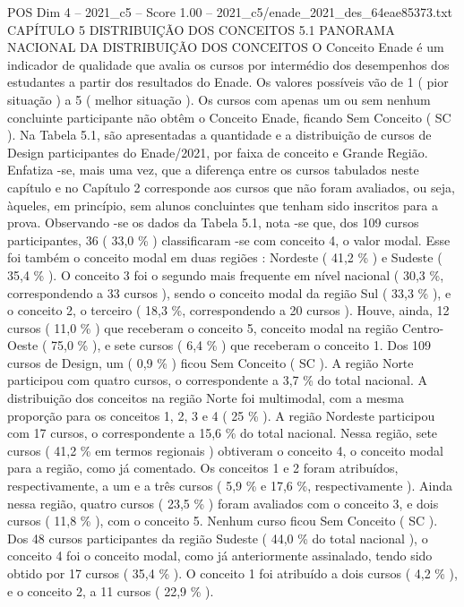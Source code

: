 \begin{textsample}{POS Dim 4 – 2021\_c5 – Score 1.00 – 2021\_c5/enade\_2021\_des\_64eae85373.txt}  \label{ex:f4_pos_217}
CAPÍTULO 5 DISTRIBUIÇÃO DOS CONCEITOS 5.1 PANORAMA NACIONAL DA DISTRIBUIÇÃO DOS CONCEITOS O Conceito Enade é um indicador de qualidade que avalia os cursos por intermédio dos desempenhos dos estudantes a partir dos resultados do Enade.
Os valores possíveis vão de 1 ( pior situação ) a 5 ( melhor situação ).
Os cursos com apenas um ou sem nenhum concluinte participante não obtêm o Conceito Enade, ficando Sem Conceito ( SC ).
Na Tabela 5.1, são apresentadas a quantidade e a distribuição de cursos de Design participantes do Enade/2021, por faixa de conceito e Grande Região.
Enfatiza -se, mais uma vez, que a diferença entre os cursos tabulados neste capítulo e no Capítulo 2 corresponde aos cursos que não foram avaliados, ou seja, àqueles, em princípio, sem alunos concluintes que tenham sido inscritos para a prova.
Observando -se os dados da Tabela 5.1, nota -se que, dos 109 cursos participantes, 36 ( 33,0 \% ) classificaram -se com conceito 4, o valor modal.
Esse foi também o conceito modal em duas regiões : Nordeste ( 41,2 \% ) e Sudeste ( 35,4 \% ).
O conceito 3 foi o segundo mais frequente em nível nacional ( 30,3 \%, correspondendo a 33 cursos ), sendo o conceito modal da região Sul ( 33,3 \% ), e o conceito 2, o terceiro ( 18,3 \%, correspondendo a 20 cursos ).
Houve, ainda, 12 cursos ( 11,0 \% ) que receberam o conceito 5, conceito modal na região Centro-Oeste ( 75,0 \% ), e sete cursos ( 6,4 \% ) que receberam o conceito 1.
Dos 109 cursos de Design, um ( 0,9 \% ) ficou Sem Conceito ( SC ).
A região Norte participou com quatro cursos, o correspondente a 3,7 \% do total nacional.
A distribuição dos conceitos na região Norte foi multimodal, com a mesma proporção para os conceitos 1, 2, 3 e 4 ( 25 \% ).
A região Nordeste participou com 17 cursos, o correspondente a 15,6 \% do total nacional.
Nessa região, sete cursos ( 41,2 \% em termos regionais ) obtiveram o conceito 4, o conceito modal para a região, como já comentado.
Os conceitos 1 e 2 foram atribuídos, respectivamente, a um e a três cursos ( 5,9 \% e 17,6 \%, respectivamente ).
Ainda nessa região, quatro cursos ( 23,5 \% ) foram avaliados com o conceito 3, e dois cursos ( 11,8 \% ), com o conceito 5.
Nenhum curso ficou Sem Conceito ( SC ).
Dos 48 cursos participantes da região Sudeste ( 44,0 \% do total nacional ), o conceito 4 foi o conceito modal, como já anteriormente assinalado, tendo sido obtido por 17 cursos ( 35,4 \% ).
O conceito 1 foi atribuído a dois cursos ( 4,2 \% ), e o conceito 2, a 11 cursos ( 22,9 \% ).

\end{textsample}
